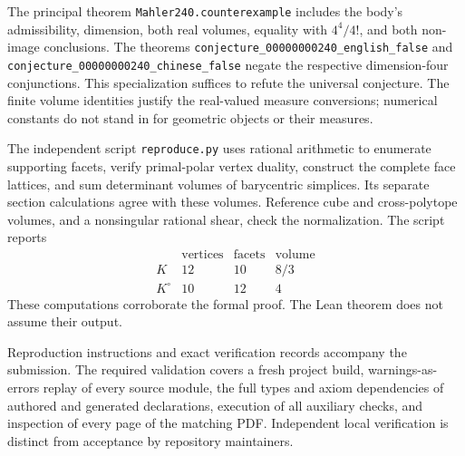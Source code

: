 \documentclass[11pt]{article}
\begin{document}
The principal theorem \texttt{Mahler240.counterexample} includes the body's
admissibility, dimension, both real volumes, equality with $4^4/4!$, and
both non-image conclusions. The theorems
\texttt{conjecture\_00000000240\_english\_false} and
\texttt{conjecture\_00000000240\_chinese\_false} negate the respective
dimension-four conjunctions. This specialization suffices to refute the
universal conjecture. The finite volume identities justify the real-valued
measure conversions; numerical constants do not stand in for geometric
objects or their measures.

The independent script \texttt{reproduce.py} uses rational arithmetic to
enumerate supporting facets, verify primal-polar vertex duality, construct
the complete face lattices, and sum determinant volumes of barycentric
simplices. Its separate section calculations agree with these volumes.
Reference cube and cross-polytope volumes, and a nonsingular rational
shear, check the normalization. The script reports
\[
 \begin{array}{c|c|c|c}
 &\text{vertices}&\text{facets}&\text{volume}\\\hline
 K&12&10&8/3\\
 K^\circ&10&12&4
 \end{array}
\]
These computations corroborate the formal proof. The Lean theorem does
not assume their output.

Reproduction instructions and exact verification records accompany the
submission. The required validation covers a fresh project build,
warnings-as-errors replay of every source module, the full types and axiom
dependencies of authored and generated declarations, execution of all
auxiliary checks, and inspection of every page of the matching PDF.
Independent local verification is distinct from acceptance by repository
maintainers.
\end{document}
